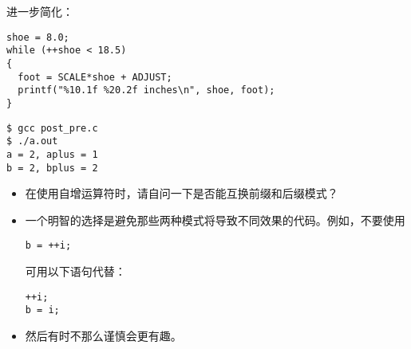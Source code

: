 \begin{frame}[fragile]
进一步简化：
\begin{lstlisting}[backgroundcolor=\color{red!10},frame=no]
shoe = 8.0;
while (++shoe < 18.5)
{
  foot = SCALE*shoe + ADJUST;
  printf("%10.1f %20.2f inches\n", shoe, foot);
}
\end{lstlisting}
\end{frame}

\begin{frame}[fragile]
    
\end{frame}

\begin{frame}[fragile]
  \begin{lstlisting}[backgroundcolor=\color{red!10},frame=no]
$ gcc post_pre.c
$ ./a.out    
a = 2, aplus = 1
b = 2, bplus = 2
\end{lstlisting}    
\end{frame}




\begin{frame}[fragile]
\begin{itemize}
\item
在使用自增运算符时，请自问一下是否能互换前缀和后缀模式？\\[0.1in]
\item
一个明智的选择是避免那些两种模式将导致不同效果的代码。例如，不要使用
\begin{lstlisting}[backgroundcolor=\color{red!10},frame=no]
b = ++i;
\end{lstlisting}
可用以下语句代替：
\begin{lstlisting}[backgroundcolor=\color{red!10},frame=no]
++i;
b = i;
\end{lstlisting}
\item 然后有时不那么谨慎会更有趣。
\end{itemize}
\end{frame}

